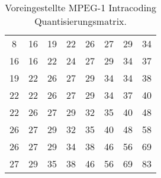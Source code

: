 \begin{table}[h!]
\centering
\begin{tabular}{|c|c|c|c|c|c|c|c|}
	\hline
	8 & 16 & 19 & 22 & 26 & 27 & 29 & 34 \\
	16 & 16 & 22 & 24 & 27 & 29 & 34 & 37 \\
	19 & 22 & 26 & 27 & 29 & 34 & 34 & 38 \\
	22 & 22 & 26 & 27 & 29 & 34 & 37 & 40 \\
	22 & 26 & 27 & 29 & 32 & 35 & 40 & 48 \\
	26 & 27 & 29 & 32 & 35 & 40 & 48 & 58 \\
	26 & 27 & 29 & 34 & 38 & 46 & 56 & 69 \\
	27 & 29 & 35 & 38 & 46 & 56 & 69 & 83 \\
	\hline
\end{tabular}
\caption{Voreingestellte MPEG-1 Intracoding Quantisierungsmatrix. \cite{symes_peter_digital_2004} }
\label{tab:default_quant}
\end{table}

